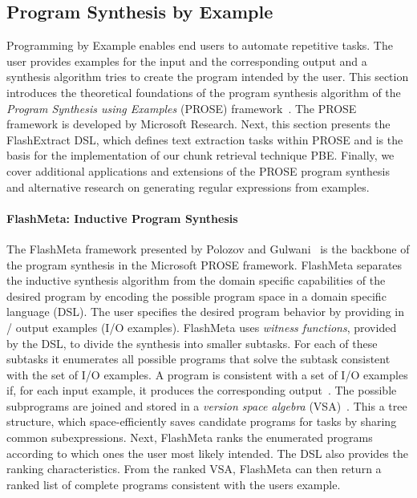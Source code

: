 \documentclass[\myrootdir/main.tex]{subfiles}
\begin{document}
\subsection{Program Synthesis by Example}
\label{sec:rw-prose}
Programming by Example enables end users to automate repetitive tasks.
The user provides examples for the input and the corresponding output and a synthesis algorithm tries to create the program intended by the user.
This section introduces the theoretical foundations of the program synthesis algorithm of the \emph{Program Synthesis using Examples} (PROSE) framework~\cite{prose2019webpage}.
The PROSE framework is developed by Microsoft Research.
Next, this section presents the FlashExtract DSL, which defines text extraction tasks within PROSE and is the basis for the implementation of our chunk retrieval technique PBE\@.
Finally, we cover additional applications and extensions of the PROSE program synthesis and alternative research on generating regular expressions from examples.

\paragraph{FlashMeta: Inductive Program Synthesis}
The FlashMeta framework presented by Polozov and Gulwani~\cite{polozov2015flashmeta:} is the backbone of the program synthesis in the Microsoft PROSE framework.
FlashMeta separates the inductive synthesis algorithm from the domain specific capabilities of the desired program by encoding the possible program space in a domain specific language (DSL).
The user specifies the desired program behavior by providing in / output examples (I/O examples).
FlashMeta uses \emph{witness functions}, provided by the DSL, to divide the synthesis into smaller subtasks.
For each of these subtasks it enumerates all possible programs that solve the subtask consistent with the set of I/O examples.
A program is consistent with a set of I/O examples if, for each input example, it produces the corresponding output~\cite{mitchell1982generalization}.
The possible subprograms are joined and stored in a \emph{version space algebra} (VSA)~\cite{mitchell1982generalization}.
This a tree structure, which space-efficiently saves candidate programs for tasks by sharing common subexpressions.
Next, FlashMeta ranks the enumerated programs according to which ones the user most likely intended.
The DSL also provides the ranking characteristics.
From the ranked VSA, FlashMeta can then return a ranked list of complete programs consistent with the users example.
\end{document}
